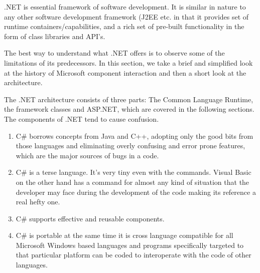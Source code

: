 \documentclass{article} %
\begin{document}
\noindent \textbf{                          }\underbar{}

\noindent \textbf{}\underbar{}

\noindent             .NET is essential framework of software development. It is similar in nature to any other software development framework (J2EE etc. in that it provides set of runtime containers/capabilities, and a rich set of pre-built functionality in the form of class libraries and API's.

\noindent \textbf{}\underbar{}

\noindent          The best way to understand what .NET offers is to observe some of the limitations of its predecessors. In this section, we take a brief and simplified look at the history of Microsoft component interaction and then a short look at the architecture. 

\noindent 

\noindent \textbf{}\underbar{}

\noindent The .NET architecture consists of three parts: The Common Language Runtime, the framework classes and ASP.NET, which are covered in the following sections. The components of .NET tend to cause confusion.

\noindent 

\noindent \textbf{}\underbar{}

\begin{enumerate}
\item \underbar{ }C\# borrows concepts from Java and C++, adopting only the good bits from those languages and eliminating overly confusing and error prone features, which are the major sources of bugs in a code. 

\item  C\# is a terse language. It's very tiny even with the commands. Visual Basic on the other hand has a command for almost any kind of situation that the developer may face during the development of the code making its reference a real hefty one. 

\item  C\# supports effective and reusable components. 

\item  C\# is portable at the same time it is cross language compatible for all Microsoft Windows based languages and programs specifically targeted to that particular platform can be coded to interoperate with the code of other languages. 
\end{enumerate}
\end{document}
